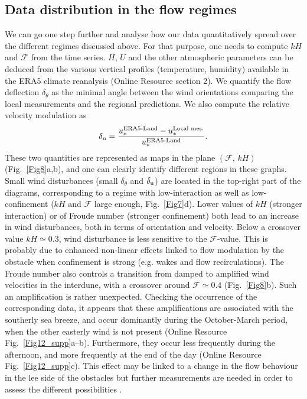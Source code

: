 \subsection{Data distribution in the flow regimes}
\label{DataDistribution}
We can go one step further and analyse how our data quantitatively spread over the different regimes discussed above. For that purpose, one needs to compute $kH$ and $\mathcal{F}$ from the time series. $H$, $U$ and the other atmospheric parameters can be deduced from the various vertical profiles (temperature, humidity) available in the ERA5 climate reanalysis (Online Resource section 2). We quantify the flow deflection $\delta_{\theta}$ as the minimal angle between the wind orientations comparing the local measurements and the regional predictions. We also compute the relative velocity modulation as
%
\begin{equation}
\delta_{\textup{u}} = \frac{u_{*}^{\textup{ERA5-Land}} -  u_{*}^{\textup{Local mes.}}}{u_{*}^{\textup{ERA5-Land}}}.
\end{equation}
%
These two quantities are represented as maps in the plane $(\mathcal{F}, \, kH)$ (Fig.~\ref{Fig8}a,b), and one can clearly identify different regions in these graphs. Small wind disturbances (small $\delta_{\theta}$ and $\delta_{\textup{u}}$) are located in the top-right part of the diagrams, corresponding to a regime with low-interaction as well as low-confinement ($k H$ and $\mathcal{F}$ large enough, Fig.~\ref{Fig7}d). Lower values of $k H$ (stronger interaction) or of Froude number (stronger confinement) both lead to an increase in wind disturbances, both in terms of orientation and velocity. Below a crossover value $k H \simeq 0.3$, wind disturbance is less sensitive to the $\mathcal{F}$-value. This is probably due to enhanced non-linear effects linked to flow modulation by the obstacle when confinement is strong (e.g. wakes and flow recirculations). The Froude number also controls a transition from damped to amplified wind velocities in the interdune, with a crossover around $\mathcal{F} \simeq 0.4$ (Fig.~\ref{Fig8}b). Such an amplification is rather unexpected. Checking the occurrence of the corresponding data, it appears that these amplifications are associated with the southerly sea breeze, and occur dominantly during the October-March period, when the other easterly wind is not present (Online Resource Fig.~\ref{Fig12_supp}a--b). Furthermore, they occur less frequently during the afternoon, and more frequently at the end of the day (Online Resource Fig.~\ref{Fig12_supp}c). This effect may be linked to a change in the flow behaviour in the lee side of the obstacles but further measurements are needed in order to assess the different possibilities \citep{baines1995, Vosper2004}.


